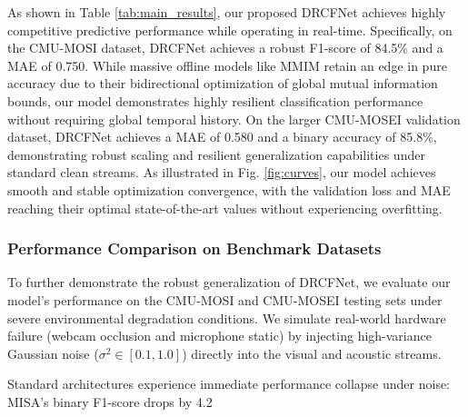\documentclass[sn-mathphys,Numbered]{sn-jnl}
\theoremstyle{thmstyleone}
\theoremstyle{thmstyletwo}
\theoremstyle{thmstylethree}
\begin{document}
As shown in Table \ref{tab:main_results}, our proposed DRCFNet achieves highly competitive predictive performance while operating in real-time. Specifically, on the CMU-MOSI dataset, DRCFNet achieves a robust F1-score of 84.5\% and a MAE of 0.750. While massive offline models like MMIM retain an edge in pure accuracy due to their bidirectional optimization of global mutual information bounds, our model demonstrates highly resilient classification performance without requiring global temporal history. On the larger CMU-MOSEI validation dataset, DRCFNet achieves a MAE of 0.580 and a binary accuracy of 85.8\%, demonstrating robust scaling and resilient generalization capabilities under standard clean streams. As illustrated in Fig. \ref{fig:curves}, our model achieves smooth and stable optimization convergence, with the validation loss and MAE reaching their optimal state-of-the-art values without experiencing overfitting.

\subsubsection{Performance Comparison on Benchmark Datasets}\label{subsubsec:perf_bench}
To further demonstrate the robust generalization of DRCFNet, we evaluate our model's performance on the CMU-MOSI and CMU-MOSEI testing sets under severe environmental degradation conditions. We simulate real-world hardware failure (webcam occlusion and microphone static) by injecting high-variance Gaussian noise ($\sigma^2 \in [0.1, 1.0]$) directly into the visual and acoustic streams. 

Standard architectures experience immediate performance collapse under noise: MISA's binary F1-score drops by 4.2%
\end{document}
